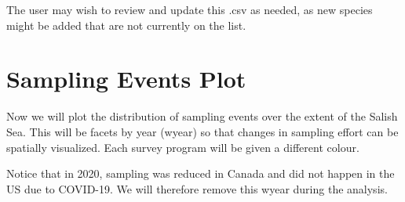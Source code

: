 \documentclass[
  letterpaper,
  DIV=11,
  numbers=noendperiod]{scrreprt}
\newenvironment{Shaded}{\begin{snugshade}}{\end{snugshade}}
\newcommand{\AttributeTok}[1]{\textcolor[rgb]{0.40,0.45,0.13}{#1}}
\newcommand{\CommentTok}[1]{\textcolor[rgb]{0.37,0.37,0.37}{#1}}
\newcommand{\ConstantTok}[1]{\textcolor[rgb]{0.56,0.35,0.01}{#1}}
\newcommand{\FunctionTok}[1]{\textcolor[rgb]{0.28,0.35,0.67}{#1}}
\newcommand{\NormalTok}[1]{\textcolor[rgb]{0.00,0.23,0.31}{#1}}
\newcommand{\OtherTok}[1]{\textcolor[rgb]{0.00,0.23,0.31}{#1}}
\newcommand{\SpecialCharTok}[1]{\textcolor[rgb]{0.37,0.37,0.37}{#1}}
\newcommand{\StringTok}[1]{\textcolor[rgb]{0.13,0.47,0.30}{#1}}
\begin{document}
The user may wish to review and update this .csv as needed, as new
species might be added that are not currently on the list.

\begin{Shaded}
\end{Shaded}

\section{Sampling Events Plot}\label{2.6Data}

Now we will plot the distribution of sampling events over the extent of
the Salish Sea. This will be facets by year (wyear) so that changes in
sampling effort can be spatially visualized. Each survey program will be
given a different colour.

Notice that in 2020, sampling was reduced in Canada and did not happen
in the US due to COVID-19. We will therefore remove this wyear during
the analysis.
\end{document}
